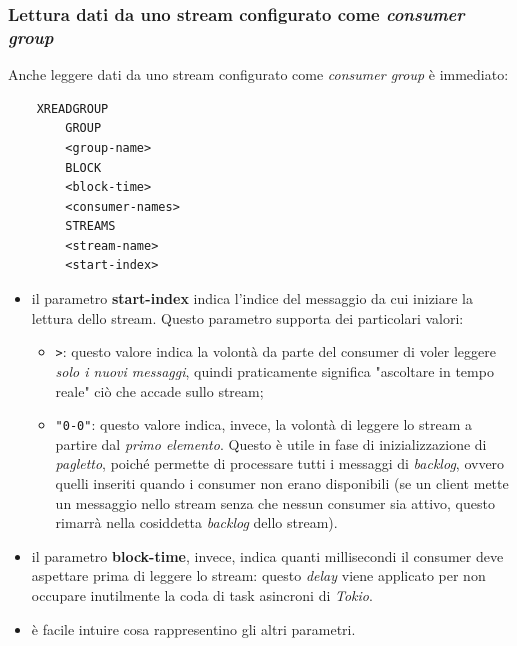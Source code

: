\subsubsection{Lettura dati da uno stream configurato come \textit{consumer group}}
Anche leggere dati da uno stream configurato come \textit{consumer group} è immediato: 
\begin{verbatim}
    XREADGROUP 
        GROUP
        <group-name>  
        BLOCK
        <block-time>
        <consumer-names> 
        STREAMS 
        <stream-name> 
        <start-index>
\end{verbatim}
\begin{itemize}
    \item il parametro \textbf{start-index} indica l'indice del messaggio da cui iniziare la lettura dello stream. Questo parametro supporta dei particolari valori:
        \begin{itemize}
            \item \verb|>|: questo valore indica la volontà da parte del consumer di voler leggere \textit{solo i nuovi messaggi}, quindi praticamente significa "ascoltare in tempo reale" ciò che accade sullo stream;
            \item  \verb|"0-0"|: questo valore indica, invece, la volontà di leggere lo stream a partire dal \textit{primo elemento}. Questo è utile in fase di inizializzazione di \textit{pagletto}, poiché permette di processare tutti i messaggi di \textit{backlog}, ovvero quelli inseriti quando i consumer non erano disponibili (se un client mette un messaggio nello stream senza che nessun consumer sia attivo, questo rimarrà nella cosiddetta \textit{backlog} dello stream).
        \end{itemize}
    \item il parametro \textbf{block-time}, invece, indica quanti millisecondi il consumer deve aspettare prima di leggere lo stream: questo \textit{delay} viene applicato per non occupare inutilmente la coda di task asincroni di \textit{Tokio}.
    \item è facile intuire cosa rappresentino gli altri parametri.
\end{itemize}
